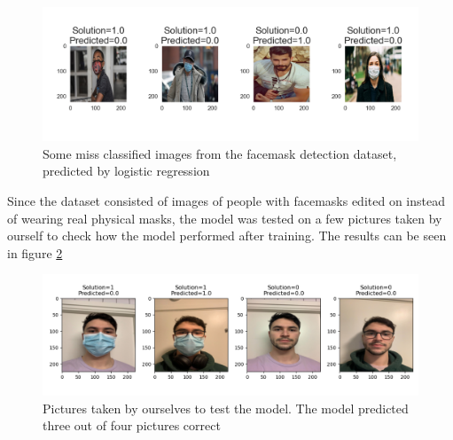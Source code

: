 \documentclass[../main.tex]{subfiles}
\begin{document}
\begin{figure}[H]
    \centering
    \includegraphics[width=1\textwidth]{assets/logreg_missclassified_facemask.png}
    \caption{Some miss classified images from the facemask detection dataset, predicted by logistic regression}
    \label{fig:missclassified_logreg_facemask}
\end{figure}


Since the dataset consisted of images of people with facemasks edited on instead of wearing real physical masks, the model was tested on a few pictures taken by ourself to check how the model performed after training. The results can be seen in figure \ref{fig:logreg_real_pics}

\begin{figure}[H]
    \centering
    \includegraphics[width=1\textwidth]{assets/log_reg_real_pics.png}
    \caption{Pictures taken by ourselves to test the model. The model predicted three out of four pictures correct}
    \label{fig:logreg_real_pics}
\end{figure}
\end{document}
